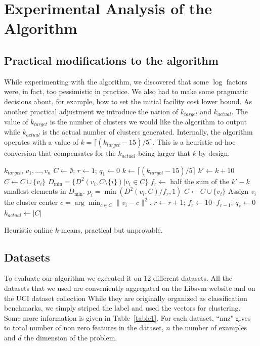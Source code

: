 \documentclass[11pt,twoside]{article}
\def\tab{\hspace{5mm}}
\begin{document}
\section{Experimental Analysis of the Algorithm}
\subsection{Practical modifications to the algorithm}
While experimenting with the algorithm, we discovered that some $\log$ factors were, in fact, too pessimistic in practice.
We also had to make some pragmatic decisions about, for example, how to set the initial facility cost lower bound.
As another practical adjustment we introduce the nation of $k_{target}$ and $k_{actual}$.
The value of $k_{target}$ is the number of clusters we would like the algorithm to output while $k_{actual}$ is the actual number of clusters generated.
Internally, the algorithm operates with a value of $k = \lceil(k_{target}-15)/5\rceil$. 
This is a heuristic ad-hoc conversion that compensates for the $k_{actual}$ being larger that $k$ by design.

\begin{algorithm}
\begin{algorithmic}
 $k_{target}$,  $v_1,\ldots,v_n$
\STATE $C \gets \emptyset$;\;\; $r \gets 1$;\;\; $q_1 \gets 0$
\STATE $k \gets \lceil(k_{target}-15)/5\rceil$
\STATE $k' \gets k+10$
	\STATE \tab $C \gets C \cup \{v_i\}$
\ENDFOR
\STATE $D_{\min} = \{D^2(v_i,C \setminus \{i\}) | v_i \in C\}$
\STATE $f_r\gets$ half the sum of the $k'-k$ smallest elements in $D_{\min}$.
	 $p_i = \min(D^2(v_i, C)/f_r,1)$
	\STATE \tab $C \gets C \cup \{v_i\}$
	\STATE Assign $v_i$ the cluster center $c = \arg\min_{c \in C}\|v_i - c\|^2$.
		\STATE $r \gets r+1$;\;\;  $f_r \gets 10\cdot f_{r-1}$;\;\; $q_r \gets 0$
	\ENDIF
\ENDFOR
\STATE $k_{actual} \gets |C|$
\caption{Heuristic online $k$-means, practical but unprovable.}\label{alg2}
\end{algorithmic}
\end{algorithm}

\subsection{Datasets}
To evaluate our algorithm we executed it on $12$ different datasets.
All the datasets that we used are conveniently aggregated on the Libsvm website \cite{libsvmData} and on the UCI dataset collection \cite{UCIdata}
While they are originally organized as classification benchmarks, we simply striped the label and used the vectors for clustering.
Some more information is given in Table~\ref{table1}. 
For each dataset, ``nnz" gives to total number of non zero features in the dataset, $n$ the number of examples and $d$ the dimension of the problem.
\end{document}
